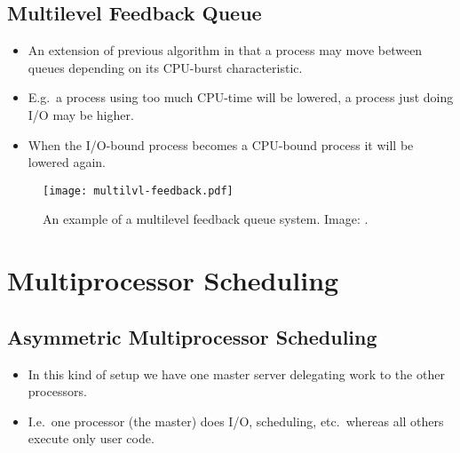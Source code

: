 \documentclass{beamer}
\begin{document}
\subsection{Multilevel Feedback Queue}

\begin{frame}{\insertsubsectionhead}
  \begin{itemize}
    \item An extension of previous algorithm in that a process may move between 
      queues depending on its CPU-burst characteristic.

    \item E.g.\ a process using too much CPU-time will be lowered, a process 
      just doing I/O may be higher.

    \item When the I/O-bound process becomes a CPU-bound process it will be 
      lowered again.

  \end{itemize}
\end{frame}

\begin{frame}{\insertsubsectionhead}
  \begin{figure}
    \texttt{[image: multilvl-feedback.pdf]}
    \caption{An example of a multilevel feedback queue system.
      Image: \cite{Silberschatz2013osc}.}
  \end{figure}
\end{frame}


\section[Multiprocessors]{Multiprocessor Scheduling}

\subsection{Asymmetric Multiprocessor Scheduling}

\begin{frame}{\insertsubsectionhead}
  \begin{itemize}
    \item In this kind of setup we have one master server delegating work to 
      the other processors.

    \item I.e.\ one processor (the master) does I/O, scheduling, etc.\ whereas 
      all others execute only user code.
  \end{itemize}
\end{frame}
\end{document}
